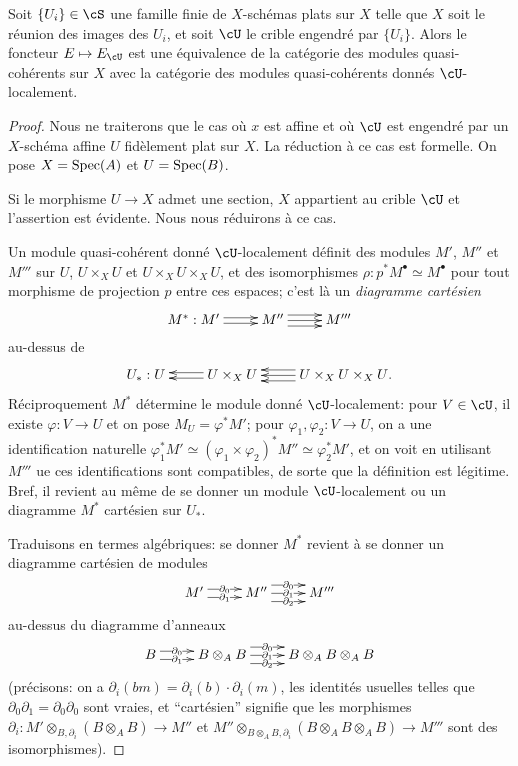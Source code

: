 \begin{theorem}\label{I:1-4-5}
Soit $\{U_i\}\in\cS$ une famille finie de $X$-schémas plats sur $X$ telle que 
$X$ soit le réunion des images des $U_i$, et soit $\cU$ le crible engendré par 
$\{U_i\}$. Alors le foncteur $E\mapsto E_\cU$ est une équivalence de la 
catégorie des modules quasi-cohérents sur $X$ avec la catégorie des modules 
quasi-cohérents donnés $\cU$-localement.
\end{theorem}
\begin{proof}
Nous ne traiterons que le cas où $x$ est affine et où $\cU$ est engendré par 
un $X$-schéma affine $U$ fidèlement plat sur $X$. La réduction à ce cas est 
formelle. On pose $X=\operatorname{Spec}(A)$ et $U=\operatorname{Spec}(B)$. 

Si le morphisme $U\to X$ admet une section, $X$ appartient au crible $\cU$ et 
l'assertion est évidente. Nous nous réduirons à ce cas. 

Un module quasi-cohérent donné $\cU$-localement définit des modules $M'$, $M''$ 
et $M'''$ sur $U$, $U\times_X U$ et $U\times_X U\times_X U$, et des 
isomorphismes $\rho:p^* M^\bullet\simeq M^\bullet$ pour tout morphisme de 
projection $p$ entre ces espaces; c'est là un \emph{diagramme cartésien} 
\[\xymatrix{
  M^* : M' \ar@<2pt>[r] \ar@<-2pt>[r] 
    & M'' \ar[r] \ar@<4pt>[r] \ar@<-4pt>[r] 
    & M'''
}\]
au-dessus de 
\[\xymatrix{
  U_* : U 
    & U\times_X U \ar@<2pt>[l] \ar@<-2pt>[l] 
    & U\times_X U\times_X U \ar[l] \ar@<4pt>[l] \ar@<-4pt>[l] \mbox{.}
}\]
Réciproquement $M^*$ détermine le module donné $\cU$-localement: pour 
$V\in\cU$, il existe $\varphi:V\to U$ et on pose $M_U=\varphi^* M'$; 
pour $\varphi_1,\varphi_2:V\to U$, on a une identification naturelle 
$\varphi_1^* M'\simeq (\varphi_1\times \varphi_2)^* M'' \simeq \varphi_2^* M'$, 
et on voit en utilisant $M'''$ ue ces identifications sont compatibles, de 
sorte que la définition est légitime. Bref, il revient au même de se donner un 
module $\cU$-localement ou un diagramme $M^*$ cartésien sur $U_*$. 

Traduisons en termes algébriques: se donner $M^*$ revient à se donner un 
diagramme cartésien de modules 
\[\xymatrix{
  M' \ar@<3pt>[r]|-{\partial_0} \ar@<-3pt>[r]|-{\partial_1} 
    & M'' \ar@<6pt>[r]|-{\partial_0} \ar[r]|-{\partial_1} \ar@<-6pt>[r]|-{\partial_2}
    & M'''
}\]
au-dessus du diagramme d'anneaux 
\[\xymatrix{
  B \ar@<3pt>[r]|-{\partial_0} \ar@<-3pt>[r]|-{\partial_1} 
    & B\otimes_A B \ar@<6pt>[r]|-{\partial_0} \ar[r]|-{\partial_1} \ar@<-6pt>[r]|-{\partial_2} 
    & B\otimes_A B\otimes_A B
}\]
(précisons: on a $\partial_i(b m)=\partial_i(b)\cdot\partial_i(m)$, les 
identités usuelles telles que $\partial_0\partial_1=\partial_0\partial_0$ 
sont vraies, et ``cartésien'' signifie que les morphismes 
$\partial_i:M'\otimes_{B,\partial_i}(B\otimes_A B)\to M''$ et 
$M''\otimes_{B\otimes_A B,\partial_i}(B\otimes_A B\otimes_A B)\to M'''$ sont 
des isomorphismes). 


\end{proof}
